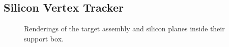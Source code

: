 \documentclass[b1]{sciposter}
\begin{document}
\begin{multicols}{3}



	\subsection*{Silicon Vertex Tracker}
	\begin{figure}
		\begin{center}
		\end{center}
		\caption{Renderings of the target assembly and silicon planes inside their support box.}
	\end{figure}





\end{multicols}
\end{document}
